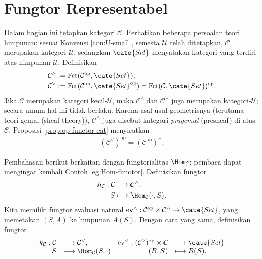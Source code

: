 \section{Fungtor Representabel}\label{sec:representable-functors}
Dalam bagian ini tetapkan kategori $\mathcal{C}$. Perhatikan beberapa persoalan teori himpunan: sesuai Konvensi \ref{con:U-small}, semesta $\mathcal{U}$ telah ditetapkan, $\mathcal{C}$ merupakan kategori-$\mathcal{U}$, sedangkan $\cate{Set}$ menyatakan kategori yang terdiri atas himpunan-$\mathcal{U}$. Definisikan
\begin{align*}
	\mathcal{C}^\wedge & := \text{Fct}(\mathcal{C}^\text{op}, \cate{Set}), \\
	\mathcal{C}^\vee & := \text{Fct}(\mathcal{C}^\text{op}, \cate{Set}^\text{op}) = \text{Fct}(\mathcal{C}, \cate{Set})^\text{op}.
\end{align*}
Jika $\mathcal{C}$ merupakan kategori kecil-$\mathcal{U}$, maka $\mathcal{C}^\wedge$ dan $\mathcal{C}^\vee$ juga merupakan kategori-$\mathcal{U}$; secara umum hal ini tidak berlaku. Karena asal-usul geometrisnya (terutama teori gemal (sheaf theory)), $\mathcal{C}^\wedge$ juga disebut kategori \emph{pragemal} (presheaf) di atas $\mathcal{C}$. Proposisi \ref{prop:op-functor-cat} menyiratkan
\begin{gather}\label{eqn:Yoneda-cat-duality}
	(\mathcal{C}^\vee)^\text{op} = (\mathcal{C}^\text{op})^\wedge .
\end{gather}

Pembahasan berikut berkaitan dengan fungtorialitas $\Hom_{\mathcal{C}}$; pembaca dapat mengingat kembali Contoh \ref{eg:Hom-functor}. Definisikan fungtor
\begin{align*}
	h_{\mathcal{C}}: \mathcal{C} & \longrightarrow \mathcal{C}^\wedge, \\
	S & \longmapsto \Hom_{\mathcal{C}}(\cdot, S).
\end{align*}
Kita memiliki fungtor evaluasi natural $\text{ev}^\wedge: \mathcal{C}^\text{op} \times \mathcal{C}^\wedge \to \cate{Set}$, yang memetakan $(S, A)$ ke himpunan $A(S)$. Dengan cara yang sama, definisikan fungtor
\[\begin{array}{rlrl}
	k_{\mathcal{C}}: \mathcal{C} & \longrightarrow \mathcal{C}^\vee, & \text{ev}^\vee: (\mathcal{C}^\vee)^\text{op} \times \mathcal{C} & \longrightarrow \cate{Set} \\
	S & \longmapsto \Hom_{\mathcal{C}}(S, \cdot) & (B, S) & \longmapsto B(S).
\end{array}\]


